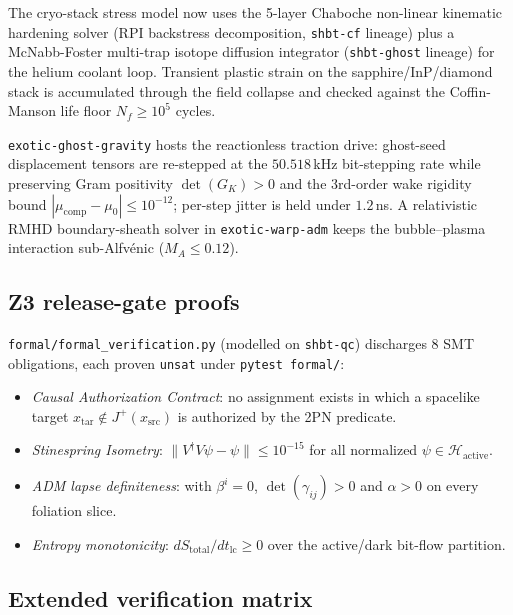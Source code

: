 \documentclass[aps,pra,10pt,onecolumn,superscriptaddress,nofootinbib,longbibliography,floatfix]{revtex4-2}
\newcommand{\ExoticFormalProofs}{8}%
\newcommand{\ExoticFormalStatus}{\texttt{unsat}}%
\newcommand{\ExoticBitStepKhz}{50.518}%
\newcommand{\ExoticStepJitterNs}{1.2}%
\begin{document}
The cryo-stack stress model now uses the 5-layer Chaboche non-linear kinematic
hardening solver (RPI backstress decomposition, \texttt{shbt-cf} lineage) plus a
McNabb-Foster multi-trap isotope diffusion integrator (\texttt{shbt-ghost} lineage)
for the helium coolant loop.  Transient plastic strain on the sapphire/InP/diamond
stack is accumulated through the field collapse and checked against the Coffin-Manson
life floor $N_f \ge 10^{5}$ cycles.

\texttt{exotic-ghost-gravity} hosts the reactionless traction drive: ghost-seed
displacement tensors are re-stepped at the $\ExoticBitStepKhz$\,kHz bit-stepping rate
while preserving Gram positivity $\det(G_K)>0$ and the 3rd-order wake rigidity bound
$|\mu_{\mathrm{comp}}-\mu_0|\le 10^{-12}$; per-step jitter is held under
$\ExoticStepJitterNs$\,ns.  A relativistic RMHD boundary-sheath solver in
\texttt{exotic-warp-adm} keeps the bubble--plasma interaction sub-Alfv\'enic
($M_A \le 0.12$).

\subsection{Z3 release-gate proofs}

\texttt{formal/formal\_verification.py} (modelled on \texttt{shbt-qc}) discharges
$\ExoticFormalProofs$ SMT obligations, each proven \ExoticFormalStatus{} under
\texttt{pytest formal/}:

\begin{itemize}
  \item \emph{Causal Authorization Contract}: no assignment exists in which a
        spacelike target $x_{\mathrm{tar}} \notin J^+(x_{\mathrm{src}})$ is
        authorized by the 2PN predicate.
  \item \emph{Stinespring Isometry}: $\|V^\dagger V\psi - \psi\| \le 10^{-15}$ for
        all normalized $\psi \in \mathcal{H}_{\mathrm{active}}$.
  \item \emph{ADM lapse definiteness}: with $\beta^i = 0$, $\det(\gamma_{ij})>0$
        and $\alpha>0$ on every foliation slice.
  \item \emph{Entropy monotonicity}: $dS_{\mathrm{total}}/dt_{\mathrm{lc}} \ge 0$
        over the active/dark bit-flow partition.
\end{itemize}

\subsection{Extended verification matrix}
\end{document}
